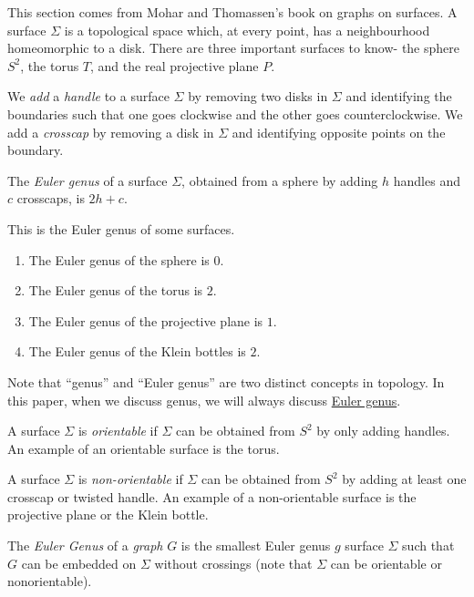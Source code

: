This section comes from Mohar and Thomassen's\cite{moharGraphsSurfaces2001} book on graphs on surfaces. A surface \(\Sigma\) is a topological space which, at every point, has a neighbourhood homeomorphic to a disk. There are three important surfaces to know- the sphere \(S^2\), the torus \(T\), and the real projective plane \(P\).
\par
We \textit{add} a \textit{handle} to a surface \(\Sigma\) by removing two disks in \(\Sigma\) and identifying the boundaries such that one goes clockwise and the other goes counterclockwise. We add a \textit{crosscap} by removing a disk in \(\Sigma\) and identifying opposite points on the boundary. 
\par
\begin{definition}
	The \textit{Euler genus} of a surface \(\Sigma\), obtained from a sphere by adding \(h\) handles and \(c\) crosscaps, is \(2h + c\).
\end{definition}

\begin{example}
	This is the Euler genus of some surfaces.
	\begin{enumerate}
		\item The Euler genus of the sphere is \(0\).
		\item The Euler genus of the torus is \(2\).
		\item The Euler genus of the projective plane is \(1\). 
		\item The Euler genus of the Klein bottles is \(2\). 
	\end{enumerate}
\end{example}

Note that ``genus'' and ``Euler genus'' are two distinct concepts in topology. In this paper, when we discuss genus, we will always discuss \underline{Euler genus}.

A surface \(\Sigma\) is \textit{orientable} if \(\Sigma\) can be obtained from \(S^2\) by only adding handles. An example of an orientable surface is the torus.

A surface \(\Sigma\) is \textit{non-orientable} if \(\Sigma\) can be obtained from \(S^2\) by adding at least one crosscap or twisted handle. An example of a non-orientable surface is the projective plane or the Klein bottle. 

The \textit{Euler Genus} of a \textit{graph} \(G\) is the smallest Euler genus \(g\) surface \(\Sigma\) such that \(G\) can be embedded on \(\Sigma\) without crossings (note that \(\Sigma\) can be orientable or nonorientable).


